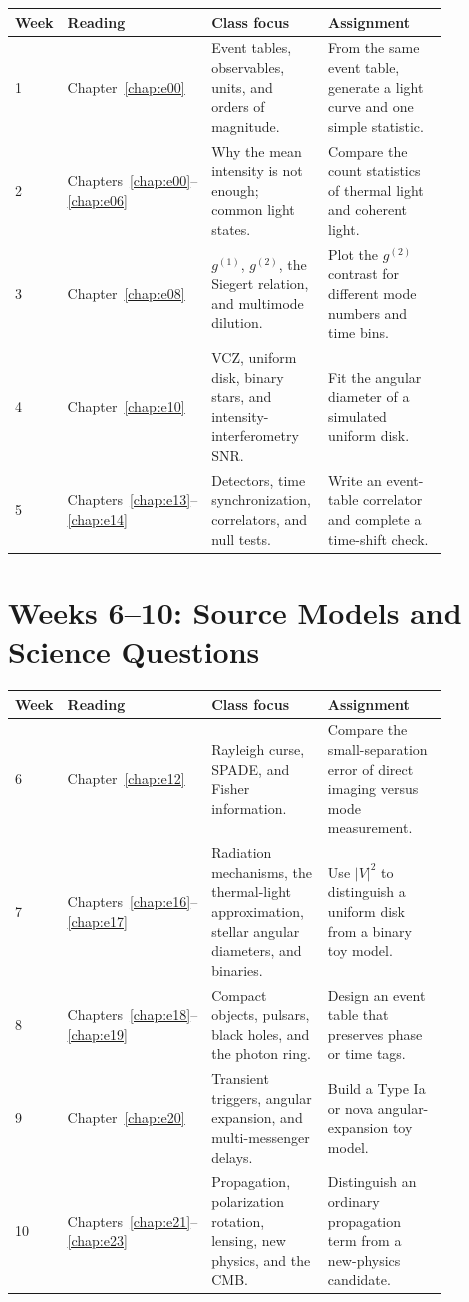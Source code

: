 \begin{longtable}{@{}p{0.09\linewidth}p{0.21\linewidth}p{0.27\linewidth}p{0.29\linewidth}@{}}
\toprule
Week & Reading & Class focus & Assignment \\
\midrule
1 & Chapter~\ref{chap:e00} & Event tables, observables, units, and orders of magnitude. & From the same event table, generate a light curve and one simple statistic. \\
2 & Chapters~\ref{chap:e00}--\ref{chap:e06} & Why the mean intensity is not enough; common light states. & Compare the count statistics of thermal light and coherent light. \\
3 & Chapter~\ref{chap:e08} & \(g^{(1)}\), \(g^{(2)}\), the Siegert relation, and multimode dilution. & Plot the \(g^{(2)}\) contrast for different mode numbers and time bins. \\
4 & Chapter~\ref{chap:e10} & VCZ, uniform disk, binary stars, and intensity-interferometry SNR. & Fit the angular diameter of a simulated uniform disk. \\
5 & Chapters~\ref{chap:e13}--\ref{chap:e14} & Detectors, time synchronization, correlators, and null tests. & Write an event-table correlator and complete a time-shift check. \\
\bottomrule
\end{longtable}

\section{Weeks 6--10: Source Models and Science Questions}
\label{appsec:f-science}

\begin{longtable}{@{}p{0.09\linewidth}p{0.21\linewidth}p{0.27\linewidth}p{0.29\linewidth}@{}}
\toprule
Week & Reading & Class focus & Assignment \\
\midrule
6 & Chapter~\ref{chap:e12} & Rayleigh curse, SPADE, and Fisher information. & Compare the small-separation error of direct imaging versus mode measurement. \\
7 & Chapters~\ref{chap:e16}--\ref{chap:e17} & Radiation mechanisms, the thermal-light approximation, stellar angular diameters, and binaries. & Use \(|V|^2\) to distinguish a uniform disk from a binary toy model. \\
8 & Chapters~\ref{chap:e18}--\ref{chap:e19} & Compact objects, pulsars, black holes, and the photon ring. & Design an event table that preserves phase or time tags. \\
9 & Chapter~\ref{chap:e20} & Transient triggers, angular expansion, and multi-messenger delays. & Build a Type Ia or nova angular-expansion toy model. \\
10 & Chapters~\ref{chap:e21}--\ref{chap:e23} & Propagation, polarization rotation, lensing, new physics, and the CMB. & Distinguish an ordinary propagation term from a new-physics candidate. \\
\bottomrule
\end{longtable}

